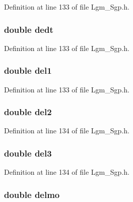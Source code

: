 Definition at line 133 of file Lgm\_\-Sgp.h.\hypertarget{struct___sgp_info_6c4a3f7535bef01f2fb7aa8ae65a1a63}{
\subsubsection[{dedt}]{\setlength{\rightskip}{0pt plus 5cm}double {\bf dedt}}}
\label{struct___sgp_info_6c4a3f7535bef01f2fb7aa8ae65a1a63}




Definition at line 133 of file Lgm\_\-Sgp.h.\hypertarget{struct___sgp_info_8c5ee7600289061b966b0e64ba835e66}{
\subsubsection[{del1}]{\setlength{\rightskip}{0pt plus 5cm}double {\bf del1}}}
\label{struct___sgp_info_8c5ee7600289061b966b0e64ba835e66}




Definition at line 133 of file Lgm\_\-Sgp.h.\hypertarget{struct___sgp_info_f52c4e502051877edca1aec48acabd34}{
\subsubsection[{del2}]{\setlength{\rightskip}{0pt plus 5cm}double {\bf del2}}}
\label{struct___sgp_info_f52c4e502051877edca1aec48acabd34}




Definition at line 134 of file Lgm\_\-Sgp.h.\hypertarget{struct___sgp_info_d460879243bdba4b857df0fe993443fe}{
\subsubsection[{del3}]{\setlength{\rightskip}{0pt plus 5cm}double {\bf del3}}}
\label{struct___sgp_info_d460879243bdba4b857df0fe993443fe}




Definition at line 134 of file Lgm\_\-Sgp.h.\hypertarget{struct___sgp_info_a4f8567c544bb137f5dc25957c63ac1a}{
\subsubsection[{delmo}]{\setlength{\rightskip}{0pt plus 5cm}double {\bf delmo}}}
\label{struct___sgp_info_a4f8567c544bb137f5dc25957c63ac1a}




